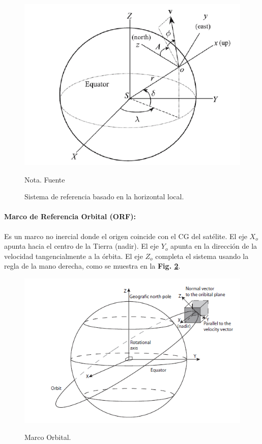 \begin{figure}[!ht]
	\begin{center}
		\includegraphics[scale=0.7]{imagenes/marco_teorico/LVLH.PNG}\\
	\end{center}
	\caption{ Sistema de referencia basado en la horizontal local.}
	\label{fig:LVLH}
	\footnotesize{Nota. Fuente \cite{cornelisse1979rocket}}
\end{figure}

\paragraph{Marco de Referencia Orbital (ORF):} Es un marco no inercial donde el origen coincide con el CG del satélite. El eje $X_o$ apunta hacia el centro de la Tierra (nadir). El eje $Y_o$ apunta en la dirección de la velocidad tangencialmente a la órbita. El eje $Z_o$ completa el sistema usando la regla de la mano derecha, como se muestra en la \textbf{Fig. \ref{fig:marco_orbital}}.

\begin{figure}[!ht]
	\begin{center}
		\includegraphics[scale=0.7]{imagenes/marco_teorico/marco_orbital.PNG}\\
	\end{center}
	\caption{ Marco Orbital\cite{Andresen2005}.}
	\label{fig:marco_orbital}
\end{figure}



